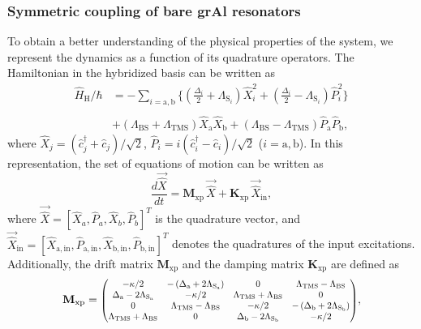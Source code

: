 \documentclass[%
reprint,
floatfix,
superscriptaddress,
amsmath,amssymb,
aps,
pra,
]{revtex4-2}
\newcommand*{\scrpt}[1]{\mathrm{#1}}
\newcommand*{\s}[1]{\ensuremath{_\scrpt{#1}}}
\begin{document}
\subsubsection{Symmetric coupling of bare grAl resonators}
\label{A_Eigenvalues}
%
To obtain a better understanding of the physical properties of the system, we represent the dynamics as a function of its quadrature operators. The Hamiltonian in the hybridized basis can be written as
%
\begin{align}
   \label{HXP}
   \hat{H}\s{H}/\hbar  & = -\sum_{i= \mathrm{a,b}} \Big \lbrace \left( \frac{\Delta_i}{2} + \Lambda_{\mathrm{S}_{i}} \right) \hat{X}_i^2  + \left( \frac{\Delta_i}{2} - \Lambda_{\mathrm{S}_{i}} \right) \hat{P}_i^2 \Big \rbrace \nonumber \\
   \\
   & + \left( \Lambda\mathrm{_{BS}} + \Lambda\mathrm{_{TMS}} \right) \hat{X}\s{a} \hat{X}\s{b} + \left( \Lambda\mathrm{_{BS}} - \Lambda\mathrm{_{TMS}} \right) \hat{P}\s{a} \hat{P}\s{b}, \nonumber 
\end{align}
% 
where $\hat X_j = (\hat c_j^{\dagger} + \hat c_j)/ \sqrt{2}$, $\hat P_i = i (\hat c_i^{\dagger} - \hat c_i)/ \sqrt{2}$ ($i = \mathrm{a}, \mathrm{b}$). 
In this representation, the set of equations of motion can be written as 
%
\begin{equation}
\label{QLE_XP}
    \frac{d \vec{\hat{X}}}{dt} = \mathbf{M}\s{xp} \, \vec{\hat X} + \mathbf{K}\s{xp} \, \vec{\hat X}\s{in},
\end{equation}
%
where  $\vec{\hat{X}} = [ \hat X_a, \hat P_a, \hat X_b, \hat P_b]^T$ is the quadrature vector, and  $\vec{\hat{X}}\s{in} = [\hat X\s{a,in}, \hat P\s{a,in}, \hat X\s{b,in}, \hat P\s{b,in}]^T$ denotes the quadratures of the input excitations. Additionally, the drift matrix $\mathbf{M}\s{xp}$ and the damping matrix $\mathbf{K}\s{xp}$ are defined as
%
\begin{equation}
    \label{MXP}
\mathbf{M}\s{xp} =  \scalebox{0.8}{$\begin{pmatrix}
         -\kappa/2 & -\left(\Delta\s{a}+2 \Lambda\s{S\s{a}}\right) & 0 & \Lambda\s{TMS}-\Lambda\s{BS} \\
         \Delta\s{a}-2 \Lambda\s{S\s{a}} & -\kappa/2 & \Lambda\s{TMS}+\Lambda\s{BS} & 0 \\
        0 & \Lambda\s{TMS}-\Lambda\s{BS} & -\kappa/2 & -\left(\Delta\s{b} + 2 \Lambda\s{S\s{b}} \right) \\
         \Lambda\s{TMS}+\Lambda\s{BS} & 0 & \Delta\s{b}-2 \Lambda\s{S\s{b}} &  -\kappa/2
\end{pmatrix}$},
\end{equation}
\end{document}
